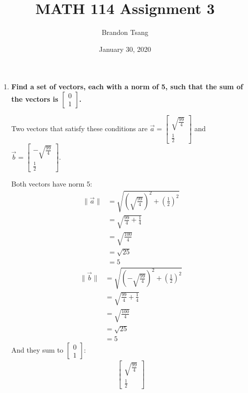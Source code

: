 \documentclass[11pt]{article}
\title{MATH 114 Assignment 3}
\author{Brandon Tsang}
\date{January 30, 2020}
\begin{document}
\maketitle
\begin{enumerate}[label=\textbf{\arabic*.}]
    \item
        \textbf{\boldmath Find a set of vectors, each with a norm of 5, such that the sum of the vectors is $\begin{bmatrix}0\\1\end{bmatrix}$.}
        \par\noindent
        Two vectors that satisfy these conditions are $\vec{a}=\begin{bmatrix}\sqrt{\frac{99}{4}}\\\frac{1}{2}\end{bmatrix}$ and $\vec{b}=\begin{bmatrix}-\sqrt{\frac{99}{4}}\\\frac{1}{2}\end{bmatrix}$.
        \par\noindent
        Both vectors have norm 5:
        \begin{align*}
            \lVert\vec{a}\rVert&=\sqrt{\left(\sqrt{\frac{99}{4}}\right)^2+\left(\frac{1}{2}\right)^2} \\
            &=\sqrt{\frac{99}{4}+\frac{1}{4}} \\
            &=\sqrt{\frac{100}{4}} \\
            &=\sqrt{25} \\
            &=5
        \end{align*}
        \begin{align*}
            \lVert\vec{b}\rVert&=\sqrt{\left(-\sqrt{\frac{99}{4}}\right)^2+\left(\frac{1}{2}\right)^2} \\
            &=\sqrt{\frac{99}{4}+\frac{1}{4}} \\
            &=\sqrt{\frac{100}{4}} \\
            &=\sqrt{25} \\
            &=5
        \end{align*}
        And they sum to $\begin{bmatrix}0\\1\end{bmatrix}$:
        \begin{align*}
            \begin{bmatrix}
                \sqrt{\frac{99}{4}} \\
                \frac{1}{2}

\end{bmatrix}
\end{align*}
\end{enumerate}
\end{document}
